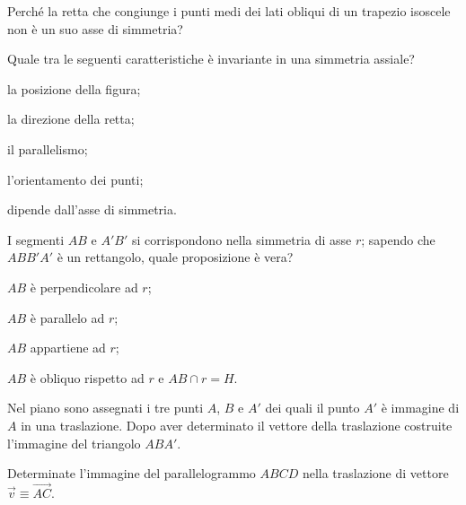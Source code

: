 \begin{esercizio}
\label{ese:8.26}
Perché la retta che congiunge i punti medi dei lati obliqui di un 
trapezio isoscele non è un suo asse di simmetria?
\end{esercizio}


\begin{esercizio}
\label{ese:8.40} %
Quale tra le seguenti caratteristiche è invariante in una simmetria 
assiale?
\begin{enumeratea}
\item la posizione della figura;
\item la direzione della retta;
\item il parallelismo;
\item l'orientamento dei punti;
\item dipende dall'asse di simmetria.
\end{enumeratea}
\end{esercizio}

\begin{esercizio}
\label{ese:8.41} %
I segmenti $AB$ e $A'B'$ si corrispondono nella simmetria di asse 
$r$; sapendo che $ABB'A'$ è un rettangolo, quale proposizione è vera?
\begin{enumeratea}
\item $AB$ è perpendicolare ad $r$;
\item $AB$ è parallelo ad $r$;
\item $AB$ appartiene ad $r$;
\item $AB$ è obliquo rispetto ad $r$ e $AB\cap r=H$.
\end{enumeratea}
\end{esercizio}

\begin{esercizio}
\label{ese:8.44} %
\begin{minipage}{0.70\textwidth}
Nel piano sono assegnati i tre punti $A$, $B$ e $A'$ dei quali il 
punto $A'$ è immagine di $A$ in una traslazione. Dopo aver 
determinato il vettore della traslazione costruite l'immagine del 
triangolo $ABA'$.
\end{minipage}\hfil
\begin{minipage}{0.25\textwidth}
  \centering 
\end{minipage}\vspace{8pt}
\end{esercizio}

\begin{esercizio}
\label{ese:8.45} %
Determinate l'immagine del parallelogrammo $ABCD$ nella traslazione 
di vettore $\vec{v} \equiv \overrightarrow{AC}$.
\end{esercizio}

